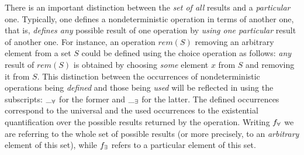 There is an important distinction between the {\em set of all} results and a {\em particular} one. Typically, one defines a nondeterministic operation in terms of another one, that is, {\em defines any} possible result of
one operation by {\em using one particular} result of another one. For instance, an operation $rem(S)$ removing an arbitrary element from a set $S$ could be
defined using the choice operation as follows: {\em any} result of $rem(S)$ is
obtained by choosing {\em some} element $x$ from $S$ and removing it from $S$.
This distinction between the occurrences of nondeterministic operations 
being {\em defined} and those being {\em used} will be reflected in using 
the subscripts: $\__\forall$ for the former and $\__\exists$ for the
latter. The defined occurrences correspond to the universal and the used occurrences to the existential quantification over the possible results returned by
the operation. Writing $f_\forall$ we are referring to the whole set of possible results (or more precisely, to an {\em arbitrary} element of this set), 
while $f_\exists$ refers to a particular element of this set. 

